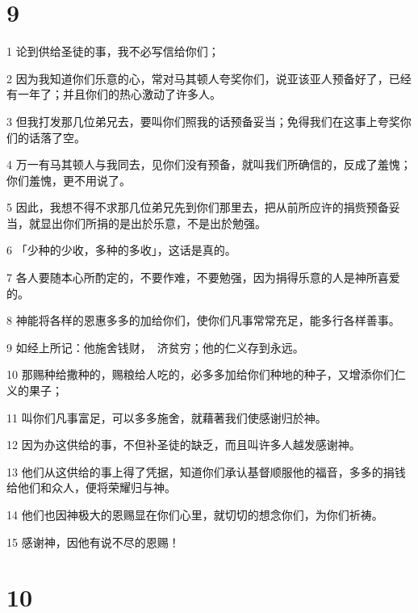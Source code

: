 \chapter{9}

\par 1 论到供给圣徒的事，我不必写信给你们；
\par 2 因为我知道你们乐意的心，常对马其顿人夸奖你们，说亚该亚人预备好了，已经有一年了；并且你们的热心激动了许多人。
\par 3 但我打发那几位弟兄去，要叫你们照我的话预备妥当；免得我们在这事上夸奖你们的话落了空。
\par 4 万一有马其顿人与我同去，见你们没有预备，就叫我们所确信的，反成了羞愧；你们羞愧，更不用说了。
\par 5 因此，我想不得不求那几位弟兄先到你们那里去，把从前所应许的捐赀预备妥当，就显出你们所捐的是出於乐意，不是出於勉强。
\par 6 「少种的少收，多种的多收」，这话是真的。
\par 7 各人要随本心所酌定的，不要作难，不要勉强，因为捐得乐意的人是神所喜爱的。
\par 8 神能将各样的恩惠多多的加给你们，使你们凡事常常充足，能多行各样善事。
\par 9 如经上所记：他施舍钱财，　济贫穷；他的仁义存到永远。
\par 10 那赐种给撒种的，赐粮给人吃的，必多多加给你们种地的种子，又增添你们仁义的果子；
\par 11 叫你们凡事富足，可以多多施舍，就藉著我们使感谢归於神。
\par 12 因为办这供给的事，不但补圣徒的缺乏，而且叫许多人越发感谢神。
\par 13 他们从这供给的事上得了凭据，知道你们承认基督顺服他的福音，多多的捐钱给他们和众人，便将荣耀归与神。
\par 14 他们也因神极大的恩赐显在你们心里，就切切的想念你们，为你们祈祷。
\par 15 感谢神，因他有说不尽的恩赐！

\chapter{10}

